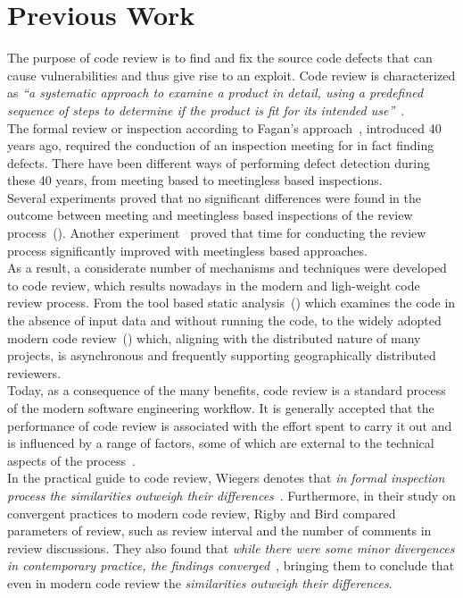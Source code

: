 \documentclass[10pt, conference]{IEEEtran}
\begin{document}
\section{Previous Work}

The purpose of code review is to find and fix the source code defects that can cause vulnerabilities 
and thus give rise to an exploit. Code review is characterized as \emph{``a systematic approach to examine 
a product in detail, using a predefined sequence of steps to determine if the product is fit for its
intended use''}~\cite{bib04}.
\\
The formal review or inspection according to Fagan's approach~\cite{bib05}, introduced 40 years ago, 
required the conduction of an inspection meeting for in fact finding defects.
There have been different ways of performing defect detection during these 40 years, from meeting based 
to meetingless based inspections. 
\\
Several experiments proved that no significant differences were found in the outcome between 
meeting and meetingless based inspections of the review process~(\cite{bib06,bib07}).
Another experiment~\cite{bib08} proved that time for conducting the review process significantly 
improved with meetingless based approaches.
\\
As a result, a considerate number of mechanisms and techniques were developed to code review, which 
results nowadays in the modern and ligh-weight code review process.
From the tool based static analysis~(\cite{bib09,bib010,bib011}) which examines the code in the absence
of input data and without running the code, to the widely
adopted modern code review~(\cite{bib012,bib013,bib014}) which, aligning with
the distributed nature of many projects, is asynchronous and
frequently supporting geographically distributed reviewers.
\\
Today, as a consequence of the many benefits, code review is a standard process of the modern software 
engineering workflow.
It is generally accepted that the performance of code review is associated with the effort spent to carry 
it out and is influenced by a range of factors, some of which are external to the technical aspects of 
the process~\cite{bib015}.
\\
In the practical guide to code review, Wiegers denotes that \emph{in formal inspection 
process the similarities outweigh their differences}~\cite{bib016}.
Furthermore, in their study on convergent practices to modern code review, Rigby and Bird 
compared parameters of review, such as review interval and the number of comments in 
review discussions. They also found that \emph{while there were some minor divergences in contemporary
practice, the findings converged}~\cite{bib01}, bringing them to conclude that even in modern code review 
the \emph{similarities outweigh their differences}. 
\end{document}
